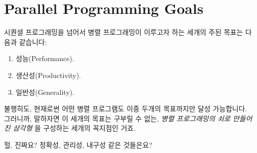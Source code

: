 
\section{Parallel Programming Goals}
\label{sec:intro:Parallel Programming Goals}

시퀀셜 프로그래밍을 넘어서 병렬 프로그래밍이 이루고자 하는 세개의 주된 목표는
다음과 같습니다:


\begin{enumerate}
\item	성능(Performance).
\item	생산성(Productivity).
\item	일반성(Generality).
\end{enumerate}


불행히도, 현재로썬 어떤 병렬 프로그램도 이중 두개의 목표까지만 달성 가능합니다.
그러니까, 말하자면 이 세개의 목표는 구부릴 수 없는, \emph{병렬 프로그래밍의
쇠로 만들어진 삼각형} 을 구성하는 세개의 꼭지점인 거죠.


\QuickQuiz{}
	헐, 진짜요? 정확성, 관리성, 내구성 같은 것들은요?

 \QuickQuizEnd

